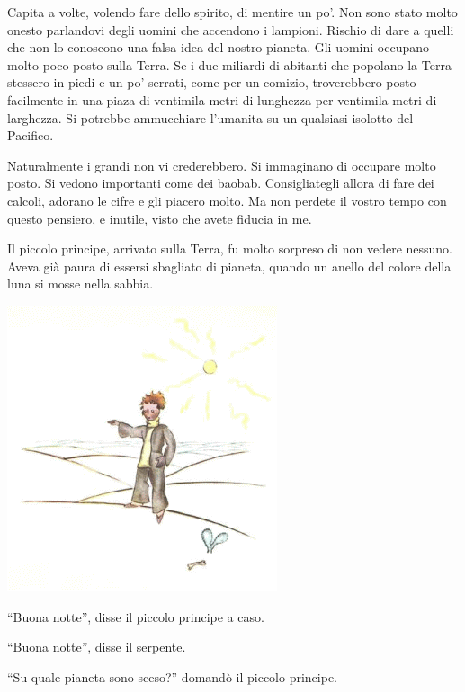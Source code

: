 \documentclass[11pt]{scrbook}
\begin{document}
Capita a volte, volendo fare dello spirito, di mentire un po'. Non sono
stato molto onesto parlandovi degli uomini che accendono i lampioni.
Rischio di dare a quelli che non lo conoscono una falsa idea del nostro
pianeta. Gli uomini occupano molto poco posto sulla Terra. Se i due
miliardi di abitanti che popolano la Terra stessero in piedi e un po'
serrati, come per un comizio, troverebbero posto facilmente in una piaza
di ventimila metri di lunghezza per ventimila metri di larghezza. Si
potrebbe ammucchiare l'umanita su un qualsiasi isolotto del Pacifico.

Naturalmente i grandi non vi crederebbero. Si immaginano di occupare
molto posto. Si vedono importanti come dei baobab. Consigliategli allora
di fare dei calcoli, adorano le cifre e gli piacero molto. Ma non
perdete il vostro tempo con questo pensiero, e inutile, visto che avete
fiducia in me.

Il piccolo principe, arrivato sulla Terra, fu molto sorpreso di non
vedere nessuno. Aveva già paura di essersi sbagliato di pianeta, quando
un anello del colore della luna si mosse nella sabbia.

\begin{center}
\includegraphics{img/naZemi}
\end{center}

``Buona notte'', disse il piccolo principe a caso.

``Buona notte'', disse il serpente.

``Su quale pianeta sono sceso?'' domandò il piccolo principe.
\end{document}
